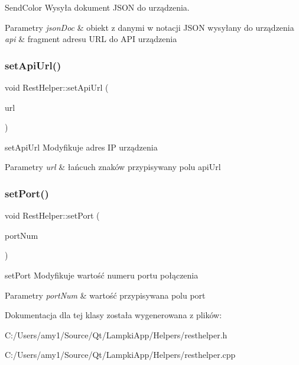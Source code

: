 Send\+Color Wysyła dokument J\+S\+ON do urządzenia. 


\begin{DoxyParams}{Parametry}
{\em json\+Doc} & obiekt z danymi w notacji J\+S\+ON wysyłany do urządzenia \\
\hline
{\em api} & fragment adresu U\+RL do A\+PI urządzenia \\
\hline
\end{DoxyParams}
\mbox{\label{class_rest_helper_ae0812d7e48940885625f939cf56b4072}} 
\subsubsection{\texorpdfstring{set\+Api\+Url()}{setApiUrl()}}
{\footnotesize\ttfamily void Rest\+Helper\+::set\+Api\+Url (\begin{DoxyParamCaption}\item[{Q\+String}]{url }\end{DoxyParamCaption})}



set\+Api\+Url Modyfikuje adres IP urządzenia 


\begin{DoxyParams}{Parametry}
{\em url} & łańcuch znaków przypisywany polu api\+Url \\
\hline
\end{DoxyParams}
\mbox{\label{class_rest_helper_ac7748378a6d1dcfddf7dc5b803f9d4b2}} 
\subsubsection{\texorpdfstring{set\+Port()}{setPort()}}
{\footnotesize\ttfamily void Rest\+Helper\+::set\+Port (\begin{DoxyParamCaption}\item[{unsigned short}]{port\+Num }\end{DoxyParamCaption})}



set\+Port Modyfikuje wartość numeru portu połączenia 


\begin{DoxyParams}{Parametry}
{\em port\+Num} & wartość przypisywana polu port \\
\hline
\end{DoxyParams}


Dokumentacja dla tej klasy została wygenerowana z plików\+:\begin{DoxyCompactItemize}
\item 
C\+:/\+Users/amy1/\+Source/\+Qt/\+Lampki\+App/\+Helpers/resthelper.\+h\item 
C\+:/\+Users/amy1/\+Source/\+Qt/\+Lampki\+App/\+Helpers/resthelper.\+cpp\end{DoxyCompactItemize}
